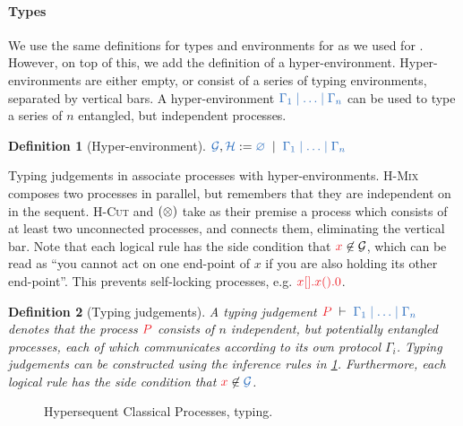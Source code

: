 \documentclass[draft,submission,copyright,creativecommons]{eptcs}
\makeatletter
\newtheorem{definition}{Definition}
\renewcommand*{\eg}{e.g.\@\xspace}
\makeatother
\begin{document}
\paragraph{Types}
We use the same definitions for types and environments for \hcp as we used for \cp.
However, on top of this, we add the definition of a hyper-environment.
Hyper-environments are either empty, or consist of a series of typing
environments, separated by vertical bars.
A hyper-environment $\ty{\Gamma_1 \hsep \dots \hsep \Gamma_n}$ can be used to
type a series of $n$ entangled, but independent processes.
\begin{definition}[Hyper-environment]\label{def:hcp-hyper-environment}
  \(
  \ty{\mathcal{G}}, \ty{\mathcal{H}} :=
  \ty{\emptyhypercontext}
  \; \mid \;
  \ty{\Gamma_1 \hsep \dots \hsep \Gamma_n}
  \)
\end{definition}\noindent
Typing judgements in \hcp associate processes with hyper-environments.
\textsc{H-Mix} composes two processes in parallel, but remembers that they are
independent on in the sequent.
\textsc{H-Cut} and $(\otimes)$ take as their premise a process which consists of
at least two unconnected processes, and connects them, eliminating the vertical
bar.
Note that each logical rule has the side condition that $\tm{x} \not\in
\mathcal{G}$, which can be read as ``you cannot act on one end-point of $x$ if
you are also holding its other end-point''.
This prevents self-locking processes, \eg
$\tm{\piBoundSend{x}{}{\piRecv{x}{}{\piHalt}}}$.
\begin{definition}[Typing judgements]\label{def:hcp}
  A typing judgement $\seq[P]{\Gamma_1 \hsep \dots \hsep \Gamma_n}$ denotes
  that the process $\tm{P}$ consists of $n$ independent, but potentially
  entangled processes, each of which communicates according to its own
  protocol $\Gamma_i$.
  Typing judgements can be constructed using the inference rules in \cref{fig:hcp}.
  Furthermore, each logical rule has the side condition that $\tm{x} \not\in
  \ty{\mathcal{G}}$.
\end{definition}\noindent
\begin{figure}
  \begin{center}\hccpInfAx \hccpInfCycle\end{center}
  \vspace*{-0.5\baselineskip}
  \begin{center}\hccpInfMix \hccpInfHalt\end{center}
  \vspace*{-0.5\baselineskip}
  \begin{center}\hccpInfBoundTens \hccpInfParr \hccpInfOne\end{center}
  \vspace*{-0.5\baselineskip}
  \begin{center}\hccpInfBot {} \end{center}
  \vspace*{0.5\baselineskip}
  \begin{center}\hccpInfWith \hccpInfNil \hccpInfTop\end{center}
  \caption{Hypersequent Classical Processes, typing.}
  \label{fig:hcp}
\end{figure}
\end{document}

